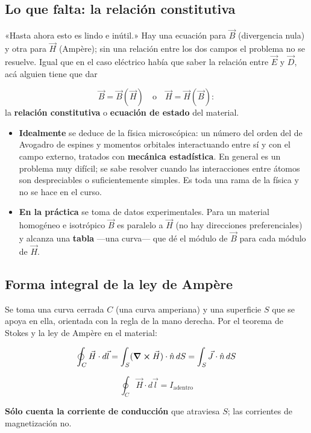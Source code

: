 \documentclass[12pt,a4paper]{article}
\begin{document}
\subsection{Lo que falta: la relación constitutiva}

«Hasta ahora esto es lindo e inútil.» Hay una ecuación para $\vec B$
(divergencia nula) y otra para $\vec H$ (Ampère); sin una relación entre los
dos campos el problema no se resuelve. Igual que en el caso eléctrico había
que saber la relación entre $\vec E$ y $\vec D$, acá alguien tiene que dar

\[
\vec B = \vec B(\vec H) \quad\text{o}\quad \vec H = \vec H(\vec B):
\]
la \textbf{relación constitutiva} o \textbf{ecuación de estado} del material.

\begin{itemize}
  \item \textbf{Idealmente} se deduce de la física microscópica: un número del orden del
  de Avogadro de espines y momentos orbitales interactuando entre sí y con el
  campo externo, tratados con \textbf{mecánica estadística}. En general es un
  problema muy difícil; se sabe resolver cuando las interacciones entre átomos
  son despreciables o suficientemente simples. Es toda una rama de la física y
  no se hace en el curso.
  \item \textbf{En la práctica} se toma de datos experimentales. Para un material
  homogéneo e isotrópico $\vec B$ es paralelo a $\vec H$ (no hay direcciones
  preferenciales) y alcanza una \textbf{tabla} ---una curva--- que dé el módulo de
  $\vec B$ para cada módulo de $\vec H$.
\end{itemize}

\subsection{Forma integral de la ley de Ampère}

Se toma una curva cerrada $C$ (una curva amperiana) y una superficie $S$ que
se apoya en ella, orientada con la regla de la mano derecha. Por el teorema de
Stokes y la ley de Ampère en el material:

\[
\oint_C \vec H\cdot d\vec l = \int_S (\curl\vec H)\cdot\hat n\,dS
= \int_S \vec J\cdot\hat n\,dS
\]

\begin{keybox}
\[
\boxed{\ \oint_C \vec H\cdot d\vec l = I_{\text{adentro}}\ }
\]
\end{keybox}

\begin{warnbox}
\textbf{Sólo cuenta la corriente de conducción} que atraviesa $S$; las corrientes
de magnetización no.
\end{warnbox}
\end{document}
